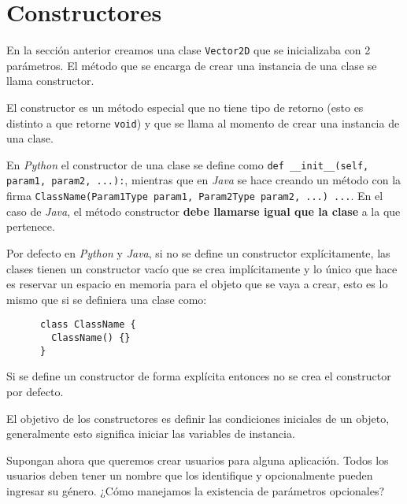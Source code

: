 \section{Constructores}
  \label{sec:constructors-1}
  
  En la sección anterior creamos una clase \texttt{Vector2D} que se inicializaba con 2
  parámetros.
  El método que se encarga de crear una instancia de una clase se llama constructor.

  El constructor es un método especial que no tiene tipo de retorno (esto es distinto a 
  que retorne \texttt{void}) y que se llama al momento de crear una instancia de
  una clase.

  En \textit{Python} el constructor de una clase se define como 
  \texttt{def __init__(self, param1, param2, ...):}, mientras que en 
  \textit{Java} se hace creando un método con la firma 
  \texttt{ClassName(Param1Type param1, Param2Type param2, ...) {...}}.
  En el caso de \textit{Java}, el método constructor \textbf{debe llamarse igual que la 
  clase} a la que pertenece.

  Por defecto en \textit{Python} y \textit{Java}, si no se define un constructor 
  explícitamente, las clases tienen un constructor vacío que se crea implícitamente y lo 
  único que hace es reservar un espacio en memoria para el objeto que se vaya a crear, 
  esto es lo mismo que si se definiera una clase como:

  \begin{listing}[ht!]
    \begin{verbatim}
      class ClassName {
        ClassName() {}
      }
    \end{verbatim}
  \end{listing}

  \begin{important}
    Si se define un constructor de forma explícita entonces no se crea el constructor por 
    defecto.
  \end{important}

  El objetivo de los constructores es definir las condiciones iniciales de un objeto, 
  generalmente esto significa iniciar las variables de instancia.

  Supongan ahora que queremos crear usuarios para alguna aplicación.
  Todos los usuarios deben tener un nombre que los identifique y opcionalmente pueden 
  ingresar su género.
  ¿Cómo manejamos la existencia de parámetros opcionales?

